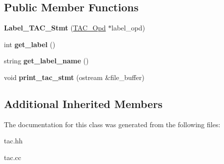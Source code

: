 \subsection*{Public Member Functions}
\begin{DoxyCompactItemize}
\item 
\mbox{\label{classLabel__TAC__Stmt_a5ed45cdb041cc485db08220057549a68}} 
{\bfseries Label\+\_\+\+T\+A\+C\+\_\+\+Stmt} (\hyperlink{classTAC__Opd}{T\+A\+C\+\_\+\+Opd} $\ast$label\+\_\+opd)
\item 
\mbox{\label{classLabel__TAC__Stmt_a71143ad1a8c25d987feb3456a5439e8c}} 
int {\bfseries get\+\_\+label} ()
\item 
\mbox{\label{classLabel__TAC__Stmt_a7114d5bef231d3471d3b58c13e9f9b82}} 
string {\bfseries get\+\_\+label\+\_\+name} ()
\item 
\mbox{\label{classLabel__TAC__Stmt_a51cf571c80d963584b832bd30e850033}} 
void {\bfseries print\+\_\+tac\+\_\+stmt} (ostream \&file\+\_\+buffer)
\end{DoxyCompactItemize}
\subsection*{Additional Inherited Members}


The documentation for this class was generated from the following files\+:\begin{DoxyCompactItemize}
\item 
tac.\+hh\item 
tac.\+cc\end{DoxyCompactItemize}
